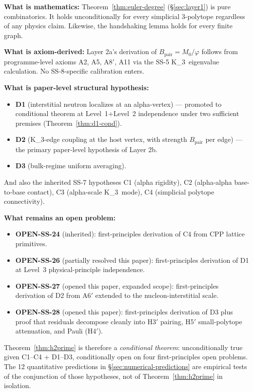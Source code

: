 \documentclass[11pt,letterpaper]{article}
\theoremstyle{definition}
\newcommand{\Mzero}{M_0}
\newcommand{\phig}{\varphi}
\newcommand{\Bpair}{B_{\text{pair}}}
\newcommand{\Kthree}{K_3}
\begin{document}
\begin{mdframed}[backgroundcolor=yellow!10,linewidth=0.5pt]
\textbf{What is mathematics:} Theorem~\ref{thm:euler-degree} (\S\ref{sec:layer1}) is pure combinatorics. It holds unconditionally for every simplicial 3-polytope regardless of any physics claim. Likewise, the handshaking lemma holds for every finite graph.

\textbf{What is axiom-derived:} Layer 2a's derivation of $\Bpair = \Mzero/\phig$ follows from programme-level axioms A2, A5, A8$'$, A11 via the SS-5 \Kthree\ eigenvalue calculation. No SS-8-specific calibration enters.

\textbf{What is paper-level structural hypothesis:}
\begin{itemize}
  \item \textbf{D1} (interstitial neutron localizes at an alpha-vertex) --- promoted to conditional theorem at Level~1+Level~2 independence under two sufficient premises (Theorem~\ref{thm:d1-cond}).
  \item \textbf{D2} (\Kthree-edge coupling at the host vertex, with strength $\Bpair$ per edge) --- the primary paper-level hypothesis of Layer 2b.
  \item \textbf{D3} (bulk-regime uniform averaging).
\end{itemize}
And also the inherited SS-7 hypotheses C1 (alpha rigidity), C2 (alpha-alpha base-to-base contact), C3 (alpha-scale \Kthree\ mode), C4 (simplicial polytope connectivity).

\textbf{What remains an open problem:}
\begin{itemize}
  \item \textbf{OPEN-SS-24} (inherited): first-principles derivation of C4 from CPP lattice primitives.
  \item \textbf{OPEN-SS-26} (partially resolved this paper): first-principles derivation of D1 at Level~3 physical-principle independence.
  \item \textbf{OPEN-SS-27} (opened this paper, expanded scope): first-principles derivation of D2 from A6$'$ extended to the nucleon-interstitial scale.
  \item \textbf{OPEN-SS-28} (opened this paper): first-principles derivation of D3 plus proof that residuals decompose cleanly into H3$'$ pairing, H5$'$ small-polytope attenuation, and Pauli (H4$'$).
\end{itemize}

Theorem~\ref{thm:h2prime} is therefore a \emph{conditional theorem}: unconditionally true given C1--C4 + D1--D3, conditionally open on four first-principles open problems. The 12 quantitative predictions in \S\ref{sec:numerical-predictions} are empirical tests of the conjunction of those hypotheses, not of Theorem~\ref{thm:h2prime} in isolation.
\end{mdframed}
\end{document}

